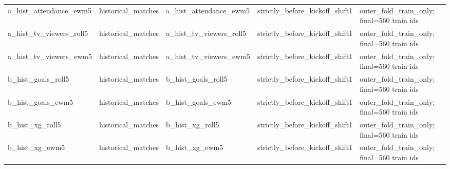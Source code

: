 {\begin{longtable}{p{}p{}p{}p{}p{}}
a\_\allowbreak{}hist\_\allowbreak{}attendance\_\allowbreak{}ewm5 & historical\_\allowbreak{}matches & a\_\allowbreak{}hist\_\allowbreak{}attendance\_\allowbreak{}ewm5 & strictly\_\allowbreak{}before\_\allowbreak{}kickoff\_\allowbreak{}shift1 & outer\_\allowbreak{}fold\_\allowbreak{}train\_\allowbreak{}only;\allowbreak{} final=560 train ids \\
a\_\allowbreak{}hist\_\allowbreak{}tv\_\allowbreak{}viewers\_\allowbreak{}roll5 & historical\_\allowbreak{}matches & a\_\allowbreak{}hist\_\allowbreak{}tv\_\allowbreak{}viewers\_\allowbreak{}roll5 & strictly\_\allowbreak{}before\_\allowbreak{}kickoff\_\allowbreak{}shift1 & outer\_\allowbreak{}fold\_\allowbreak{}train\_\allowbreak{}only;\allowbreak{} final=560 train ids \\
a\_\allowbreak{}hist\_\allowbreak{}tv\_\allowbreak{}viewers\_\allowbreak{}ewm5 & historical\_\allowbreak{}matches & a\_\allowbreak{}hist\_\allowbreak{}tv\_\allowbreak{}viewers\_\allowbreak{}ewm5 & strictly\_\allowbreak{}before\_\allowbreak{}kickoff\_\allowbreak{}shift1 & outer\_\allowbreak{}fold\_\allowbreak{}train\_\allowbreak{}only;\allowbreak{} final=560 train ids \\
b\_\allowbreak{}hist\_\allowbreak{}goals\_\allowbreak{}roll5 & historical\_\allowbreak{}matches & b\_\allowbreak{}hist\_\allowbreak{}goals\_\allowbreak{}roll5 & strictly\_\allowbreak{}before\_\allowbreak{}kickoff\_\allowbreak{}shift1 & outer\_\allowbreak{}fold\_\allowbreak{}train\_\allowbreak{}only;\allowbreak{} final=560 train ids \\
b\_\allowbreak{}hist\_\allowbreak{}goals\_\allowbreak{}ewm5 & historical\_\allowbreak{}matches & b\_\allowbreak{}hist\_\allowbreak{}goals\_\allowbreak{}ewm5 & strictly\_\allowbreak{}before\_\allowbreak{}kickoff\_\allowbreak{}shift1 & outer\_\allowbreak{}fold\_\allowbreak{}train\_\allowbreak{}only;\allowbreak{} final=560 train ids \\
b\_\allowbreak{}hist\_\allowbreak{}xg\_\allowbreak{}roll5 & historical\_\allowbreak{}matches & b\_\allowbreak{}hist\_\allowbreak{}xg\_\allowbreak{}roll5 & strictly\_\allowbreak{}before\_\allowbreak{}kickoff\_\allowbreak{}shift1 & outer\_\allowbreak{}fold\_\allowbreak{}train\_\allowbreak{}only;\allowbreak{} final=560 train ids \\
b\_\allowbreak{}hist\_\allowbreak{}xg\_\allowbreak{}ewm5 & historical\_\allowbreak{}matches & b\_\allowbreak{}hist\_\allowbreak{}xg\_\allowbreak{}ewm5 & strictly\_\allowbreak{}before\_\allowbreak{}kickoff\_\allowbreak{}shift1 & outer\_\allowbreak{}fold\_\allowbreak{}train\_\allowbreak{}only;\allowbreak{} final=560 train ids \\

\end{longtable}}
